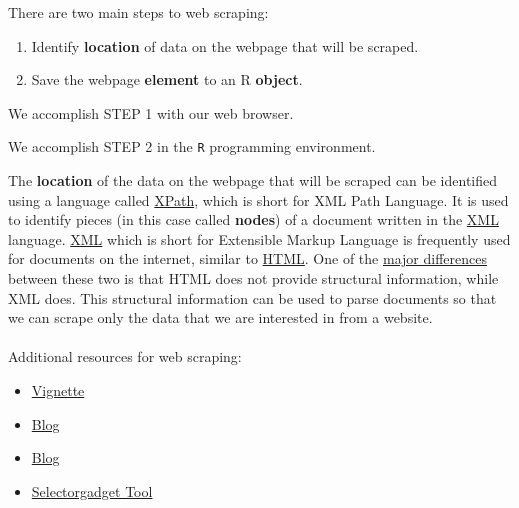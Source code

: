 \documentclass[
]{article}
\providecommand{\tightlist}{%
  \setlength{\itemsep}{0pt}\setlength{\parskip}{0pt}}
\begin{document}
There are two main steps to web scraping:

\begin{enumerate}
\def\labelenumi{\arabic{enumi}.}
\item
  Identify \textbf{location} of data on the webpage that will be
  scraped.
\item
  Save the webpage \textbf{element} to an R \textbf{object}.
\end{enumerate}

We accomplish STEP 1 with our web browser.

We accomplish STEP 2 in the \texttt{R} programming environment.

The \textbf{location} of the data on the webpage that will be scraped
can be identified using a language called
\href{https://en.wikipedia.org/wiki/XPath}{XPath}, which is short for
XML Path Language. It is used to identify pieces (in this case called
\textbf{nodes}) of a document written in the
\href{https://en.wikipedia.org/wiki/XML}{XML} language.
\href{https://en.wikipedia.org/wiki/XML}{XML} which is short for
Extensible Markup Language is frequently used for documents on the
internet, similar to \href{https://en.wikipedia.org/wiki/HTML}{HTML}.
One of the
\href{https://techdifferences.com/difference-between-xml-and-html.html}{major
differences} between these two is that HTML does not provide structural
information, while XML does. This structural information can be used to
parse documents so that we can scrape only the data that we are
interested in from a website.

\hypertarget{section-14}{%
\paragraph{}\label{section-14}}

Additional resources for web scraping:

\begin{itemize}
\tightlist
\item
  \href{https://rstudio-pubs-static.s3.amazonaws.com/266430_f3fd4660b2744751ab144aa130768a06.html}{Vignette}
\item
  \href{http://blog.corynissen.com/2015/01/using-rvest-to-scrape-html-table.html}{Blog}
\item
  \href{http://research.libd.org/rstatsclub/post/introduction-to-scraping-and-wranging-tables-from-research-articles/\#.Xw878ZNKhQJ}{Blog}
\item
  \href{https://cran.r-project.org/web/packages/rvest/vignettes/selectorgadget.html}{Selectorgadget
  Tool}
\end{itemize}
\end{document}
